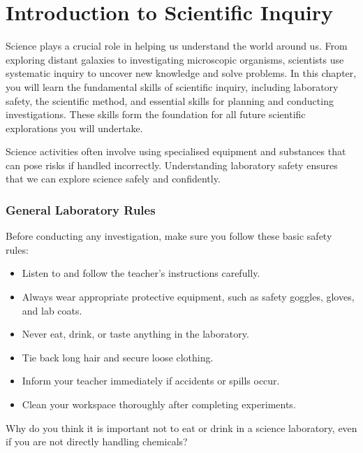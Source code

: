 \chapter{Introduction to Scientific Inquiry}

Science plays a crucial role in helping us understand the world around us. From exploring distant galaxies to investigating microscopic organisms, scientists use systematic inquiry to uncover new knowledge and solve problems. In this chapter, you will learn the fundamental skills of scientific inquiry, including laboratory safety, the scientific method, and essential skills for planning and conducting investigations. These skills form the foundation for all future scientific explorations you will undertake.

\FloatBarrier

Science activities often involve using specialised equipment and substances that can pose risks if handled incorrectly. Understanding laboratory safety ensures that we can explore science safely and confidently.

\subsection{General Laboratory Rules}

Before conducting any investigation, make sure you follow these basic safety rules:

\begin{itemize}
    \item Listen to and follow the teacher's instructions carefully.
    \item Always wear appropriate protective equipment, such as safety goggles, gloves, and lab coats.
    \item Never eat, drink, or taste anything in the laboratory.
    \item Tie back long hair and secure loose clothing.
    \item Inform your teacher immediately if accidents or spills occur.
    \item Clean your workspace thoroughly after completing experiments.
\end{itemize}

\begin{stopandthink}
Why do you think it is important not to eat or drink in a science laboratory, even if you are not directly handling chemicals?
\end{stopandthink}

